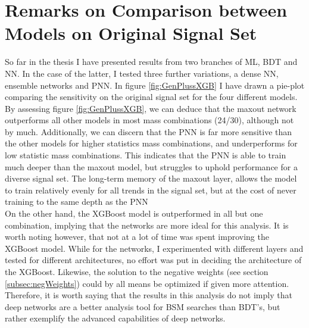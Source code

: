 \section{Remarks on Comparison between Models on Original Signal Set}
So far in the thesis I have presented results from two branches of \ac{ML}, \acf{BDT} and \acf{NN}. In the case of the latter, I tested
three further variations, a dense \ac{NN}, ensemble networks and \ac{PNN}. In figure \ref{fig:GenPlussXGB} I have drawn a pie-plot comparing 
the sensitivity on the original signal set for the four different models. By assessing figure \ref{fig:GenPlussXGB}, we can deduce that the 
maxout network outperforms all other models in most mass combinations (24/30), although not by much. Additionally, we can discern that the \ac{PNN}
is far more sensitive than the other models for higher statistics mass combinations, and underperforms for low statistic mass combinations.
This indicates that the \ac{PNN} is able to train much deeper than the maxout model, but struggles to uphold performance for a diverse signal set. 
The long-term memory of the maxout layer, allows the model to train relatively evenly for all trends in the signal set, but at the cost of never 
training to the same depth as the \ac{PNN}
\\
On the other hand, the XGBoost model is outperformed in all but one combination, implying that the networks are more ideal for this analysis. 
It is worth noting however, that not at a lot of time was spent improving the XGBoost model. While for the networks, I experimented with different layers and 
tested for different architectures, no effort was put in deciding the architecture of the XGBoost. Likewise, the solution to the negative weights (see 
section \ref{subsec:negWeights}) could by all means be optimized if given more attention. Therefore, it is worth saying that the results in this analysis
do not imply that deep networks are a better analysis tool for \ac{BSM} searches than \ac{BDT}'s, but rather exemplify the advanced capabilities of deep networks.

